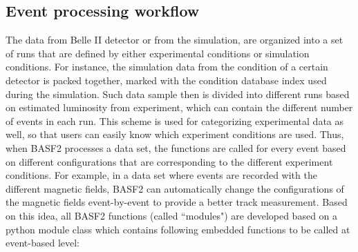 \begin{comment}
As for the externals, it contains the many packages or libraries that provide functionalities BASF2 needs during the execution or installation. For example, some basic packages, like gcc compiler, cmake, tar, wget, Python and git are included. In particular, due to the dependence of the analysis tools that may be frequently used by Python, around 100 additional Python packages are installed as the externals, such as ``Numpy" and ``matplotlib" packages that provide functions for statistical calculations and plotting. The complexity of building all of these external software could be tough for users so that the compiled versions that cover the common platforms are available from BASF2 official repository. 
Tools are collections of shell or Python scripts for setting up BASF2 and externals environment. It can easily handle the need of setting up an environment of specific BASF2 version and the externals tied to that version. It also provides a function to setting up the environment of developing BASF2, where developers can get one developing copy of BASF2 and write the additional codes as the modification, so the compatibility of BASF2 could be easily maintained by building a release version from the developing branches. In this thesis, two new packages are developed and built with release-05-01-01 version BASF2. This developing version of BASF2 contains all functions that release-05-01-01 has. The details will be discussed later. 
\end{comment}

\subsection{Event processing workflow}
The data from Belle II detector or from the simulation, are organized into a set of runs that are defined by either experimental conditions or simulation conditions. For instance, the simulation data from the condition of a certain detector is packed together, marked with the condition database index used during the simulation.  Such data sample then is divided into different runs based on estimated luminosity from experiment, which can contain the different number of events in each run.  This scheme is used for categorizing experimental data as well, so that users can easily know which experiment conditions are used. Thus, when BASF2 processes a data set, the functions are called for every event based on different configurations that are corresponding to the different experiment conditions. For example, in a data set where events are recorded with the different magnetic fields, BASF2 can automatically change the configurations of the magnetic fields event-by-event to provide a better track measurement. Based on this idea, all BASF2 functions (called ``modules") are developed based on a python module class which contains following embedded functions to be called at event-based level: 


